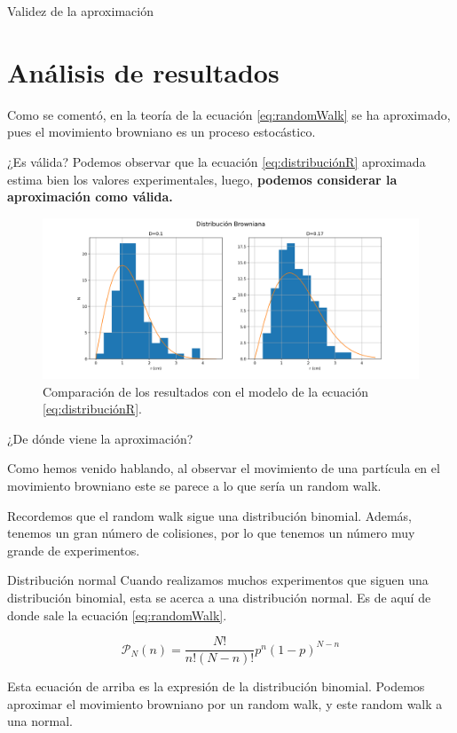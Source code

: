 \documentclass{beamer}
\begin{document}
\begin{frame}{Validez de la aproximación}
\section{Análisis de resultados}

Como se comentó, en la teoría de la ecuación \ref{eq:randomWalk} se ha aproximado, pues el movimiento browniano es un proceso estocástico.

\begin{block}{¿Es válida?}
Podemos observar que la ecuación \ref{eq:distribuciónR} aproximada estima bien los valores experimentales, luego, \textbf{podemos considerar la aproximación como válida.}
\end{block}

\begin{figure}[h!]
\begin{center}
\includegraphics[scale=0.25]{Comparacion.png}
\caption{Comparación de los resultados con el modelo de la ecuación \ref{eq:distribuciónR}.}
\end{center}
\end{figure}
\end{frame}

\begin{frame}{¿De dónde viene la aproximación?}

Como hemos venido hablando, al observar el movimiento de una partícula en el movimiento browniano este se parece a lo que sería un random walk.

Recordemos que el random walk sigue una distribución binomial. Además, tenemos un gran número de colisiones, por lo que tenemos un número muy grande de experimentos.

\begin{block}{Distribución normal \cite{Reif_2010}}
Cuando realizamos muchos experimentos que siguen una distribución binomial, esta se acerca a una distribución normal. Es de aquí de donde sale la ecuación \ref{eq:randomWalk}.
\end{block}

$$
\mathcal{P}_N (n) = \frac{N!}{n! (N-n)!} p^n (1-p)^{N-n}
$$

Esta ecuación de arriba es la expresión de la distribución binomial. Podemos aproximar el movimiento browniano por un random walk, y este random walk a una normal.
\end{frame}
\end{document}

